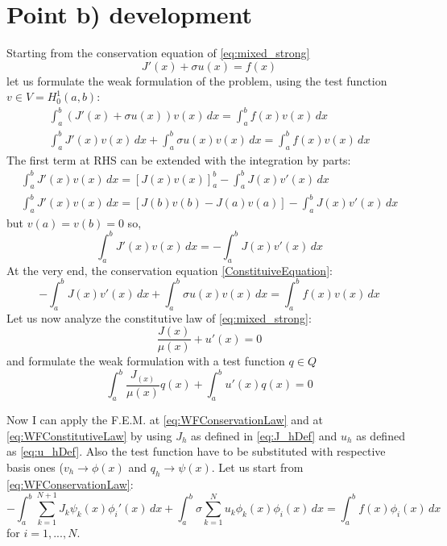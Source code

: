 \documentclass{article}
\begin{document}
\section{Point b) development}
Starting from the conservation equation of \eqref{eq:mixed_strong}
\begin{equation}
    J'(x)+\sigma u(x) = f(x) 
    \label{ConstituiveEquation}
\end{equation}
let us formulate the weak formulation of the problem, using the test function $v \in V = H_0^1(a,b)$:
\begin{align*} 
    \int_a^b (J'(x) + \sigma u(x)) v(x) \, dx = \int_a^b f(x) v(x) \, dx \\
    \int_a^b J'(x) v(x) \, dx + \int_a^b \sigma u(x) v(x) \, dx = \int_a^b f(x) v(x) \,  dx
\end{align*}
The first term at RHS can be extended with the integration by parts:
\begin{align*}
    \int_a^b J'(x) v(x) \, dx= [J(x)v(x)]_a^b - \int_a^b J(x) v'(x) \, dx \\
    \int_a^b J'(x) v(x)\, dx = [J(b)v(b) - J(a) v(a)] - \int_a^b J(x) v'(x) \, dx
\end{align*}
but $v(a)=v(b)=0$ so,
\begin{equation}
    \int_a^b J'(x) v(x) \, dx= - \int_a^b J(x) v'(x) \, dx
\end{equation}
At the very end, the conservation equation \eqref{ConstituiveEquation}:
\begin{equation}
    - \int_a^b J(x) v'(x) \, dx  + \int_a^b \sigma u(x) v(x) \, dx = \int_a^b f(x) v(x) \,  dx
    \label{eq:WFConservationLaw}
\end{equation}
Let us now analyze the constitutive law of \eqref{eq:mixed_strong}:
\begin{equation}
    \frac{J(x)}{\mu(x)} + u'(x) = 0 
\end{equation}
and formulate the weak formulation with a test function $q \in Q$
\begin{equation}
    \int_a^b \frac{J_(x)}{\mu(x)} q(x) + \int_a^b u'(x) q(x) = 0 
    \label{eq:WFConstitutiveLaw}
\end{equation}

Now I can apply the F.E.M. at \eqref{eq:WFConservationLaw} and at \eqref{eq:WFConstitutiveLaw} by using $J_h$ as defined in \eqref{eq:J_hDef} and $u_h$ as defined as \eqref{eq:u_hDef}. Also the test function have to be substituted with respective basis ones ($v_h \rightarrow \phi(x)$  and $q_h \rightarrow \psi(x)$. 
Let us start from \eqref{eq:WFConservationLaw}:
\begin{equation}
    - \int_a^b \sum_{k=1}^{N+1} J_k \psi_k(x) \phi_i'(x) \, dx  + \int_a^b \sigma \sum_{k=1}^{N} u_k \phi_k(x) \phi_i(x) \, dx = \int_a^b f(x) \phi_i(x) \,  dx
\end{equation}
for $i=1,...,N$.
\end{document}

